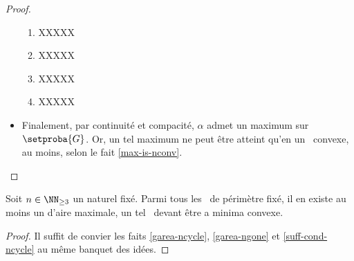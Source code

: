 \begin{proof}
\begin{itemize}
\begin{enumerate}
			\item XXXXX

			\item XXXXX

			\item XXXXX

			\item XXXXX
        \end{enumerate}


        \item Finalement, par continuité et compacité, $\alpha$ admet un maximum sur $\setproba{G}$.
        Or, un tel maximum ne peut être atteint qu'en un \ngone\ convexe, au moins, selon le fait \ref{max-is-nconv}.
    \end{itemize}
\end{proof}




\begin{fact} \label{suff-cond}
    Soit $n \in \NN_{\geq3}$ un naturel fixé.
    Parmi tous les \ngones\ de périmètre fixé, il en existe au moins un d'aire maximale, un tel \ngone\ devant être a minima convexe.
\end{fact}


\begin{proof}
    Il suffit de convier les faits \ref{garea-ncycle}, \ref{garea-ngone} et \ref{suff-cond-ncycle} au même banquet des idées.
\end{proof}
